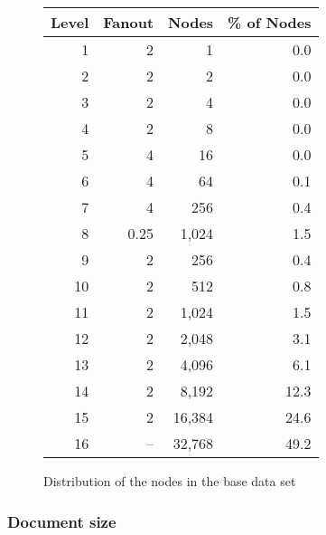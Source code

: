 \begin {figure}
\begin {center}
\renewcommand{\baselinestretch}{1.1}
\begin{tabular}{|r|r|r|r|} \hline
{\bf Level} & {\bf Fanout} & {\bf Nodes} & {\bf \% of Nodes} \\ \hline
1 & 2 & 1 & 0.0 \\ 
2 & 2 & 2 & 0.0 \\ 
3 & 2 & 4 & 0.0 \\ 
4 & 2 & 8 & 0.0 \\ 
5 & 4 & 16 & 0.0 \\ 
6 & 4 & 64 & 0.1 \\ 
7 & 4 & 256 & 0.4 \\ 
8 & 0.25 & 1,024 & 1.5 \\ 
9 & 2 & 256 & 0.4 \\ 
10 & 2 & 512 & 0.8 \\ 
11 & 2 & 1,024 & 1.5 \\ 
12 & 2 & 2,048 & 3.1 \\ 
13 & 2 & 4,096 & 6.1 \\
14 & 2 & 8,192 & 12.3 \\ 
15 & 2 & 16,384 & 24.6 \\ 
16 & -- & 32,768 & 49.2 \\ \hline
\end {tabular}
\caption{\label{table:dist}Distribution of the nodes in the base data
set}
\label{fig:fanout}
\renewcommand{\baselinestretch}{\cheatbaseline}
\end {center}
\end {figure}

\subsubsection{Document size}

